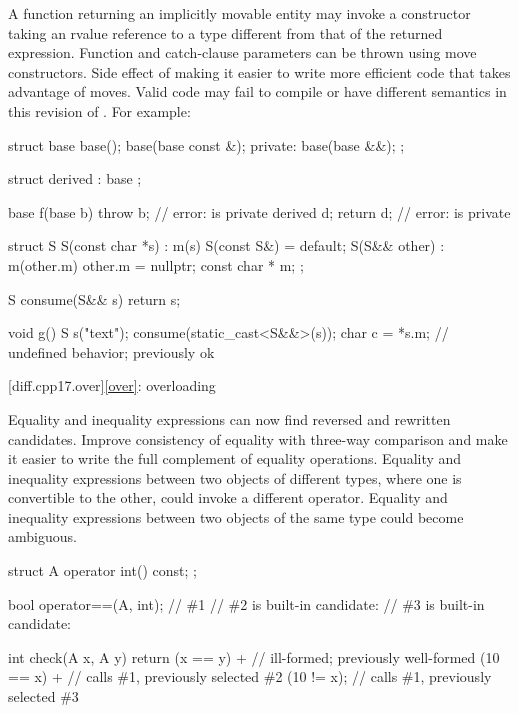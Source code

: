 \change
A function returning an implicitly movable entity
may invoke a constructor taking an rvalue reference to a type
different from that of the returned expression.
Function and catch-clause parameters can be thrown using move constructors.
\rationale
Side effect of making it easier to write
more efficient code that takes advantage of moves.
\effect
Valid \CppXVII{} code may fail to compile or have different semantics
in this revision of \Cpp{}.
For example:
\begin{codeblock}
struct base {
  base();
  base(base const &);
private:
  base(base &&);
};

struct derived : base {};

base f(base b) {
  throw b;                      // error:  is private
  derived d;
  return d;                     // error:  is private
}

struct S {
  S(const char *s) : m(s) { }
  S(const S&) = default;
  S(S&& other) : m(other.m) { other.m = nullptr; }
  const char * m;
};

S consume(S&& s) { return s; }

void g() {
  S s("text");
  consume(static_cast<S&&>(s));
  char c = *s.m;                // undefined behavior; previously ok
}
\end{codeblock}

[diff.cpp17.over]{\ref{over}: overloading}

\change
Equality and inequality expressions can now find
reversed and rewritten candidates.
\rationale
Improve consistency of equality with three-way comparison
and make it easier to write the full complement of equality operations.
\effect
Equality and inequality expressions between two objects of different types,
where one is convertible to the other,
could invoke a different operator.
Equality and inequality expressions between two objects of the same type
could become ambiguous.
\begin{codeblock}
struct A {
  operator int() const;
};

bool operator==(A, int);        // \#1
// \#2 is built-in candidate: 
// \#3 is built-in candidate: 

int check(A x, A y) {
  return (x == y) +             // ill-formed; previously well-formed
    (10 == x) +                 // calls \#1, previously selected \#2
    (10 != x);                  // calls \#1, previously selected \#3
}
\end{codeblock}

